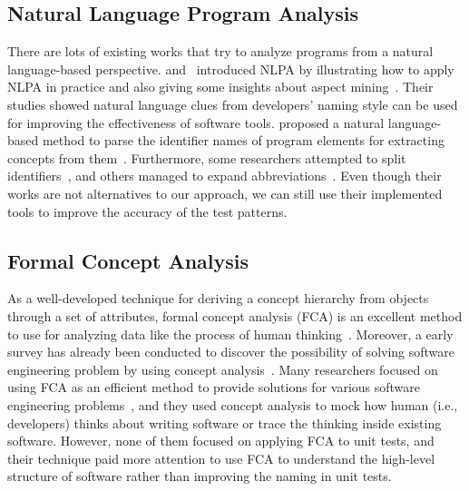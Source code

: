 \subsection{Natural Language Program Analysis}

There are lots of existing works that try to analyze programs from a natural language-based perspective.
%
\citeauthor{pollock2007introducing} and~\citeauthor{shepherd2007using} introduced NLPA by illustrating how to apply NLPA in practice and also giving some insights about aspect mining~\cite{pollock2007introducing,shepherd2007using,pollock2009natural}.
%
Their studies showed natural language clues from developers' naming style can be used for improving the effectiveness of software tools.
%
\citeauthor{abebe2010natural} proposed a natural language-based method to parse the identifier names of program elements for extracting concepts from them~\cite{abebe2010natural}.
%
Furthermore, some researchers attempted to split identifiers~\cite{enslen2009mining,butler2011improving,guerrouj2013tidier,hill2014empirical}, and others managed to expand abbreviations~\cite{hill2008amap,madani2010recognizing,corazza2012linsen}.
%
Even though their works are not alternatives to our approach, we can still use their implemented tools to improve the accuracy of the test patterns.


\subsection{Formal Concept Analysis}

As a well-developed technique for deriving a concept hierarchy from objects through a set of attributes, formal concept analysis (FCA) is an excellent method to use for analyzing data like the process of human thinking~\cite{ganter2012formal,yao2004comparative}.
%
Moreover, a early survey has already been conducted to discover the possibility of solving software engineering problem by using concept analysis~\cite{tilley2005survey}.
%
Many researchers focused on using FCA as an efficient method to provide solutions for various software engineering problems~\cite{godin2005formal,park2000software,cellier2008formal,hesse2005formal,mens2005delving}, and they used concept analysis to mock how human (i.e., developers) thinks about writing software or trace the thinking inside existing software.
%
However, none of them focused on applying FCA to unit tests, and their technique paid more attention to use FCA to understand the high-level structure of software rather than improving the naming in unit tests.

